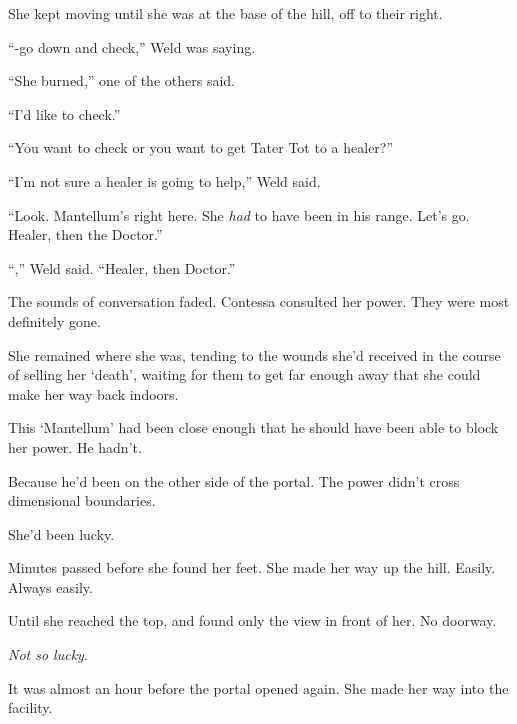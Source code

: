 She kept moving until she was at the base of the hill, off to their right.



``-go down and check,'' Weld was saying.



``She burned,'' one of the others said.



``I'd like to check.''



``You want to check or you want to get Tater Tot to a healer?''



``I'm not sure a healer is going to help,'' Weld said.



``Look.  Mantellum's right here.  She \emph{had} to have been in his range.  Let's go.  Healer, then the Doctor.''



``\ldotsRight,'' Weld said.  ``Healer, then Doctor.''



The sounds of conversation faded.  Contessa consulted her power.  They were most definitely gone.



She remained where she was, tending to the wounds she'd received in the course of selling her `death', waiting for them to get far enough away that she could make her way back indoors.



This `Mantellum' had been close enough that he should have been able to block her power.  He hadn't.



Because he'd been on the other side of the portal.  The power didn't cross dimensional boundaries.



She'd been lucky.



Minutes passed before she found her feet.  She made her way up the hill.  Easily.  Always easily.



Until she reached the top, and found only the view in front of her.  No doorway.



\emph{Not so lucky}.



\sectionbreak



It was almost an hour before the portal opened again.  She made her way into the facility.



